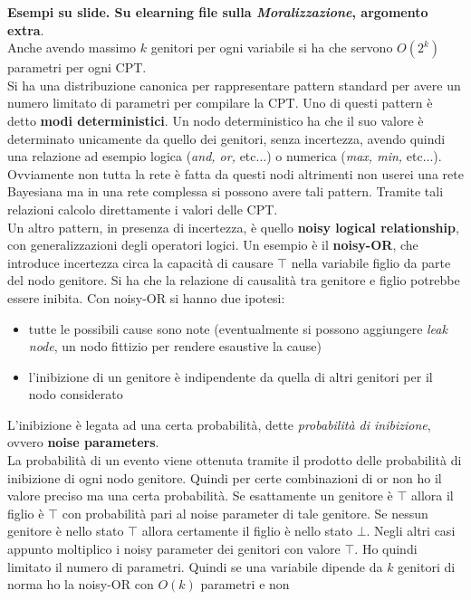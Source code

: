 \message{ !name(modprob.tex)}\documentclass[a4paper,12pt, oneside]{book}
\begin{document}
\textbf{Esempi su slide. Su elearning file sulla \textit{Moralizzazione},
  argomento extra}.\\
Anche avendo massimo $k$ genitori per ogni variabile si ha che servono $O(2^k)$
parametri per ogni CPT.\\
Si ha una distribuzione canonica per rappresentare pattern standard per avere un
numero limitato di parametri per compilare la CPT. Uno di questi pattern è detto
\textbf{modi deterministici}. Un nodo deterministico ha che il suo valore è
determinato unicamente da quello dei genitori, senza incertezza, avendo quindi
una relazione ad esempio logica (\textit{and, or,} etc$\ldots$) o numerica
(\textit{max, min, }etc$\ldots$). Ovviamente non tutta la rete è fatta da questi
nodi altrimenti non userei una rete Bayesiana ma in una rete complessa si
possono avere tali pattern. Tramite tali relazioni calcolo direttamente i valori
delle CPT.\\
Un altro pattern, in presenza di incertezza, è quello \textbf{noisy logical
  relationship}, con generalizzazioni degli operatori logici. Un esempio è il
\textbf{noisy-OR}, che introduce incertezza circa la capacità di causare $\top$
nella variabile figlio da parte del nodo genitore. Si ha che la relazione di
causalità tra genitore e figlio potrebbe essere inibita. Con noisy-OR si hanno due
ipotesi:
\begin{itemize}
  \item tutte le possibili cause sono note (eventualmente si possono aggiungere
  \textit{leak node}, un nodo fittizio per rendere esaustive la cause)
  \item l'inibizione di un genitore è indipendente da quella di altri genitori
  per il nodo considerato
\end{itemize}
L'inibizione è legata ad una certa probabilità, dette \textit{probabilità di
  inibizione}, ovvero \textbf{noise parameters}.\\
La probabilità di un evento viene ottenuta tramite il prodotto delle probabilità
di inibizione di ogni nodo genitore. Quindi per certe combinazioni di or non ho
il valore preciso ma una certa probabilità. Se esattamente un genitore è $\top$
allora il figlio è $\top$ con probabilità pari al noise parameter di tale
genitore. Se nessun genitore è nello stato $\top$ allora certamente il figlio è
nello stato $\bot$. Negli
altri casi appunto moltiplico i noisy parameter dei genitori con valore
$\top$. Ho quindi limitato il numero di parametri. Quindi se una variabile
dipende da $k$ genitori di norma ho la noisy-OR con $O(k)$ parametri e non
\end{document}
